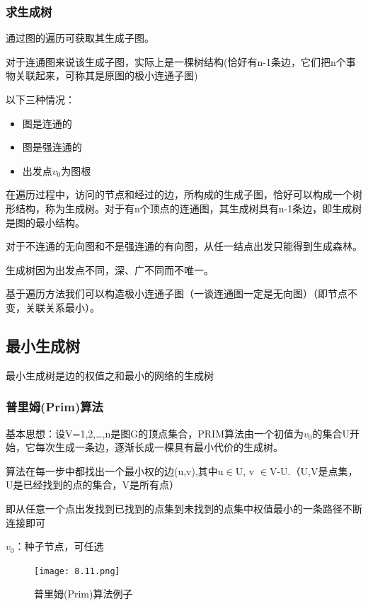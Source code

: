 \documentclass[AutoFakeBold]{LZUThesis2007}
\begin{document}
			\subsubsection{求生成树}
通过图的遍历可获取其生成子图。

对于连通图来说该生成子图，实际上是一棵树结构(恰好有n-1条边，它们把n个事物关联起来，可称其是原图的极小连通子图)

以下三种情况：
\begin{itemize}
	\item 图是连通的
	\item 图是强连通的
	\item 出发点$v_{0}$为图根
\end{itemize}
在遍历过程中，访问的节点和经过的边，所构成的生成子图，恰好可以构成一个树形结构，称为生成树。对于有n个顶点的连通图，其生成树具有n-1条边，即生成树是图的最小结构。

对于不连通的无向图和不是强连通的有向图，从任一结点出发只能得到生成森林。

生成树因为出发点不同，深、广不同而不唯一。

基于遍历方法我们可以构造极小连通子图（一谈连通图一定是无向图）（即节点不变，关联关系最小）。

			\subsection{最小生成树}
最小生成树是边的权值之和最小的网络的生成树
				\subsubsection{普里姆(Prim)算法}
				基本思想：设V={1,2,…,n}是图G的顶点集合，PRIM算法由一个初值为{$v_{0}$}的集合U开始，它每次生成一条边，逐渐长成一棵具有最小代价的生成树。

算法在每一步中都找出一个最小权的边(u,v),其中u$\in$U, v $\in$V-U.（U,V是点集，U是已经找到的点的集合，V是所有点）

即从任意一个点出发找到已找到的点集到未找到的点集中权值最小的一条路径不断连接即可

$v_{0}$：种子节点，可任选
\begin{figure}[H]
    \centering
    \texttt{[image: 8.11.png]}
    \caption{普里姆(Prim)算法例子}
    \label{fig_install_texlive}
\end{figure}
\end{document}
